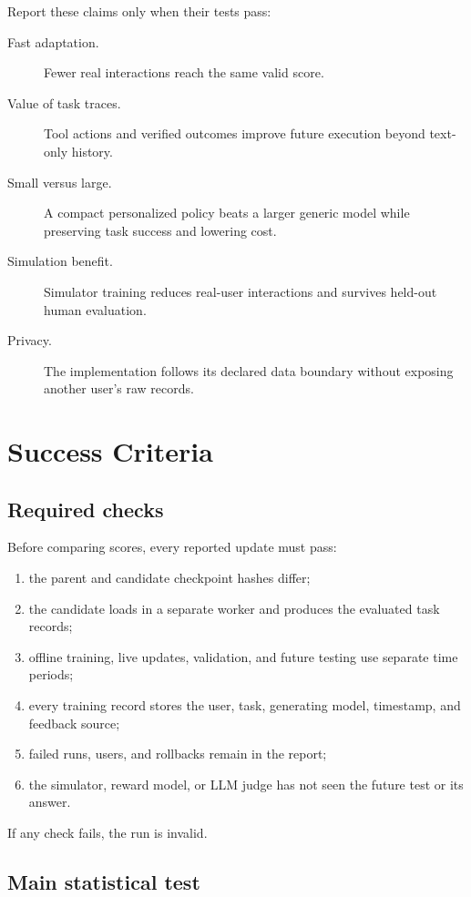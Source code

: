 \documentclass[11pt]{article}
\begin{document}
Report these claims only when their tests pass:
\begin{description}
\item[Fast adaptation.] Fewer real interactions reach the same valid score.
\item[Value of task traces.] Tool actions and verified outcomes improve future
  execution beyond text-only history.
\item[Small versus large.] A compact personalized policy beats a larger
  generic model while preserving task success and lowering cost.
\item[Simulation benefit.] Simulator training reduces real-user interactions
  and survives held-out human evaluation.
\item[Privacy.] The implementation follows its declared data boundary without
  exposing another user's raw records.
\end{description}

\section{Success Criteria}
\label{sec:success}

\subsection{Required checks}

Before comparing scores, every reported update must pass:
\begin{enumerate}
  \item the parent and candidate checkpoint hashes differ;
  \item the candidate loads in a separate worker and produces the evaluated
  task records;
  \item offline training, live updates, validation, and future testing use
  separate time periods;
  \item every training record stores the user, task, generating model,
  timestamp, and feedback source;
  \item failed runs, users, and rollbacks remain in the report;
  \item the simulator, reward model, or LLM judge has not seen the future test
  or its answer.
\end{enumerate}
If any check fails, the run is invalid.

\subsection{Main statistical test}
\end{document}
